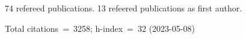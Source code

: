 74 refereed publications. 13 refeered publications as first author.

Total citations~=~3258; h-index~=~32 (2023-05-08)